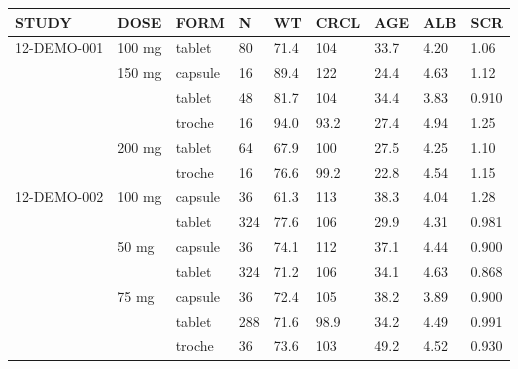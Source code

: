 \setlength{\tabcolsep}{5pt}
\begin{threeparttable}
\renewcommand\arraystretch{1.3}
\begin{tabular}[h]{lllllllll}
\hline
STUDY & DOSE & FORM & N & WT & CRCL & AGE & ALB & SCR \\
\hline
12-DEMO-001 & 100 mg & tablet & 80 & 71.4 & 104 & 33.7 & 4.20 & 1.06 \\
 & 150 mg & capsule & 16 & 89.4 & 122 & 24.4 & 4.63 & 1.12 \\
 &  & tablet & 48 & 81.7 & 104 & 34.4 & 3.83 & 0.910 \\
 &  & troche & 16 & 94.0 & 93.2 & 27.4 & 4.94 & 1.25 \\
 & 200 mg & tablet & 64 & 67.9 & 100 & 27.5 & 4.25 & 1.10 \\
 &  & troche & 16 & 76.6 & 99.2 & 22.8 & 4.54 & 1.15 \\
12-DEMO-002 & 100 mg & capsule & 36 & 61.3 & 113 & 38.3 & 4.04 & 1.28 \\
 &  & tablet & 324 & 77.6 & 106 & 29.9 & 4.31 & 0.981 \\
 & 50 mg & capsule & 36 & 74.1 & 112 & 37.1 & 4.44 & 0.900 \\
 &  & tablet & 324 & 71.2 & 106 & 34.1 & 4.63 & 0.868 \\
 & 75 mg & capsule & 36 & 72.4 & 105 & 38.2 & 3.89 & 0.900 \\
 &  & tablet & 288 & 71.6 & 98.9 & 34.2 & 4.49 & 0.991 \\
 &  & troche & 36 & 73.6 & 103 & 49.2 & 4.52 & 0.930 \\
\hline
\end{tabular}
\end{threeparttable}
